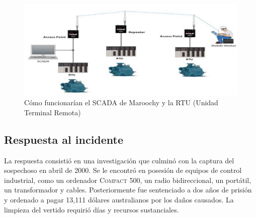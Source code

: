 
    
    
    

\begin{figure}[htbp]
    \centering
    \includegraphics{images/maroochyScada.png}
    \caption{Cómo funcionarían el \textsc{SCADA} de Maroochy y la \textsc{RTU} (Unidad Terminal Remota)}
    \label{fig:maroochyScada}
\end{figure}


\newpage

\subsection{Respuesta al incidente}
La respuesta consistió en una investigación que culminó con la captura del sospechoso en abril de 2000. Se le encontró en posesión de equipos de control industrial, como un ordenador \textsc{Compact 500}, un radio bidireccional, un portátil, un transformador y cables. Posteriormente fue sentenciado a dos años de prisión y ordenado a pagar 13,111 dólares australianos por los daños causados. La limpieza del vertido requirió días y recursos sustanciales.

